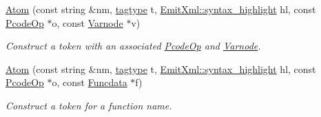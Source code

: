 \begin{DoxyCompactItemize}
\mbox{\hyperlink{struct_print_language_1_1_atom_ad94a0897a54ad3f3c30d6ad84c39964a}{Atom}} (const string \&nm, \mbox{\hyperlink{class_print_language_a7102f70f47777d8b17af52c5157c473e}{tagtype}} t, \mbox{\hyperlink{class_emit_xml_a7c3577436da429c3c75f4b82cac6864f}{Emit\+Xml\+::syntax\+\_\+highlight}} hl, const \mbox{\hyperlink{class_pcode_op}{Pcode\+Op}} $\ast$o, const \mbox{\hyperlink{class_varnode}{Varnode}} $\ast$v)
\begin{DoxyCompactList}\small\item\em Construct a token with an associated \mbox{\hyperlink{class_pcode_op}{Pcode\+Op}} and \mbox{\hyperlink{class_varnode}{Varnode}}. \end{DoxyCompactList}\item 
\mbox{\hyperlink{struct_print_language_1_1_atom_ac0e4eb3d9a0590545aa63ae5e223138f}{Atom}} (const string \&nm, \mbox{\hyperlink{class_print_language_a7102f70f47777d8b17af52c5157c473e}{tagtype}} t, \mbox{\hyperlink{class_emit_xml_a7c3577436da429c3c75f4b82cac6864f}{Emit\+Xml\+::syntax\+\_\+highlight}} hl, const \mbox{\hyperlink{class_pcode_op}{Pcode\+Op}} $\ast$o, const \mbox{\hyperlink{class_funcdata}{Funcdata}} $\ast$f)
\begin{DoxyCompactList}\small\item\em Construct a token for a function name. \end{DoxyCompactList}\end{DoxyCompactItemize}
